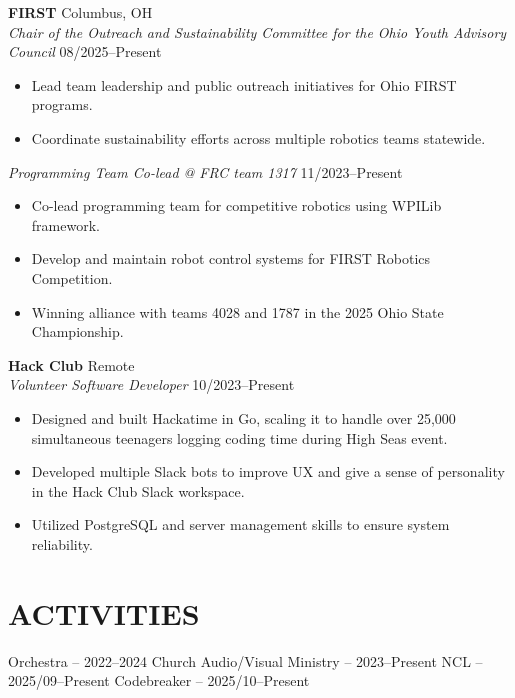 \documentclass[a4paper,10pt]{article}
\begin{document}
\textbf{FIRST} \hfill Columbus, OH\\
\textit{Chair of the Outreach and Sustainability Committee for the Ohio Youth Advisory Council} \hfill 08/2025--Present
\begin{minipage}{0.8\textwidth}
\begin{itemize}[nosep,after=\strut, leftmargin=1em, itemsep=3pt,label=--]
\item Lead team leadership and public outreach initiatives for Ohio FIRST programs.
\item Coordinate sustainability efforts across multiple robotics teams statewide.
\end{itemize}
\end{minipage}

\textit{Programming Team Co-lead @ FRC team 1317} \hfill 11/2023--Present
\begin{minipage}{0.8\textwidth}
\begin{itemize}[nosep,after=\strut, leftmargin=1em, itemsep=3pt,label=--]
\item Co-lead programming team for competitive robotics using WPILib framework.
\item Develop and maintain robot control systems for FIRST Robotics Competition.
\item Winning alliance with teams 4028 and 1787 in the 2025 Ohio State Championship.
\end{itemize}
\end{minipage}

\textbf{Hack Club} \hfill Remote\\
\textit{Volunteer Software Developer} \hfill 10/2023--Present
\begin{minipage}{0.8\textwidth}
\begin{itemize}[nosep,after=\strut, leftmargin=1em, itemsep=3pt,label=--]
\item Designed and built Hackatime in Go, scaling it to handle over 25,000 simultaneous teenagers logging coding time during High Seas event.
\item Developed multiple Slack bots to improve UX and give a sense of personality in the Hack Club Slack workspace.
\item Utilized PostgreSQL and server management skills to ensure system reliability.
\end{itemize}
\end{minipage}

\section{ACTIVITIES}
\begin{center}
{\small Orchestra -- 2022--2024 \textbar{} Church Audio/Visual Ministry -- 2023--Present \textbar{} NCL -- 2025/09--Present \textbar{} Codebreaker -- 2025/10--Present}
\end{center}

\vfill
{}
\end{document}

